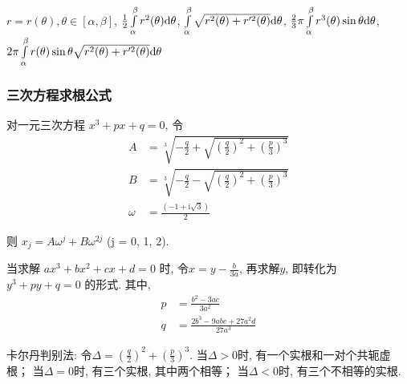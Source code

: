 \documentclass[landscape, twocolumn, 8pt, a4paper, twoside]{extarticle}
\begin{document}
\begin{itemize}
  $r = r(\theta), \theta \in [\alpha, \beta]$,
  $\frac{1}{2}\int\limits_{\alpha}^{\beta}r^2(\theta) {\rm d}\theta $,
  $\int\limits_{\alpha}^{\beta} \sqrt{r^{2}(\theta) + r^{\prime 2}(\theta)} {\rm d}\theta$,
  $\frac{2}{3}\pi\int\limits_{\alpha}^{\beta}r^3(\theta)\sin\theta{\rm d}\theta$,
  $2\pi\int\limits_{\alpha}^{\beta}r(\theta)\sin\theta\sqrt{r^2(\theta)+r^{\prime2}(\theta)}{\rm d}\theta$

\end{itemize}

\subsubsection{三次方程求根公式}
对一元三次方程
$x ^ 3 + px + q = 0$,
令
\begin{align*}
  A &= \sqrt[3]{-\frac{q}{2}+\sqrt{(\frac{q}{2})^2+(\frac{p}{3})^3}} \\
  B &= \sqrt[3]{-\frac{q}{2}-\sqrt{(\frac{q}{2})^2+(\frac{p}{3})^3}} \\ 
  \omega &= \frac{(-1 + \mathrm{i} \sqrt{3})}{2}
\end{align*}

则 $x_j = A\omega^{j} + B\omega^{2j}$ (j = 0, 1, 2).

当求解 $ax ^ 3 + bx ^ 2 + cx + d = 0$ 时, 令$x = y - \frac{b}{3a}$, 再求解$y$, 即转化为$y^3 + py + q = 0$ 的形式. 
其中, 
\begin{align*}
  p &= \frac{b^2 - 3ac}{3a^2} \\
  q &= \frac{2b ^ 3 - 9 abc + 27 a ^ 2 d}{27 a ^ 3}
\end{align*}

卡尔丹判别法: 
令$\Delta = (\frac{q}{2}) ^ 2 + (\frac{p}{3}) ^ 3$. 
当$\Delta > 0$时, 有一个实根和一对个共轭虚根；
当$\Delta = 0$时, 有三个实根, 其中两个相等；
当$\Delta < 0$时, 有三个不相等的实根. 
\end{document}
